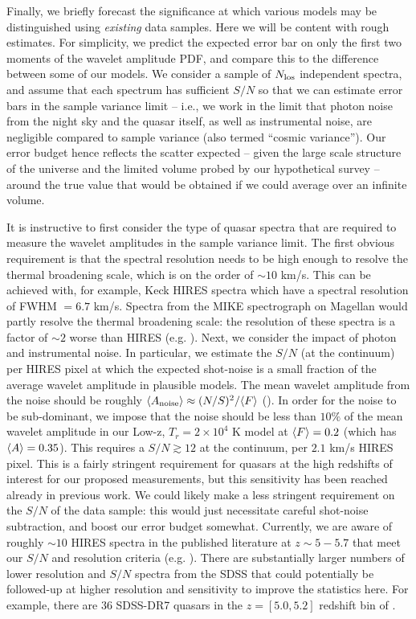 Finally, we briefly forecast the significance at which various models may be distinguished using {\it existing} data samples. Here
we will be content with rough estimates. For simplicity, we predict the expected error bar on
only the first two moments of the wavelet amplitude PDF, and compare this to the difference between some of our models. 
We consider a sample of $N_{\rm los}$ independent spectra, and assume that each spectrum has sufficient $S/N$ so that
we can estimate error bars in the sample variance limit -- i.e., we work in the limit that photon noise from the night
sky and the quasar itself, as well as instrumental noise, are negligible compared to sample variance (also termed ``cosmic variance''). Our error budget hence reflects the scatter expected -- given the large scale structure of the universe and the limited
volume probed by our hypothetical survey -- around the true value that would be obtained if we could average over an infinite
volume.

It is instructive to first consider the type of quasar spectra that are required to measure the wavelet amplitudes in
the sample variance limit. The first obvious requirement is that the spectral resolution needs to be high enough to resolve
the thermal broadening scale, which is on the order of $\sim 10$ km/s. This can be achieved with, for example, Keck HIRES spectra
which have a spectral resolution of FWHM $= 6.7$ km/s. Spectra from the MIKE spectrograph
on Magellan would partly resolve the thermal broadening scale: the resolution of these spectra is a factor of $\sim 2$ worse
than HIRES (e.g. \citealt{Becker:2010cu}). Next, we consider the impact of photon and instrumental noise. In particular,
we estimate the $S/N$ (at the continuum) per HIRES pixel at which the expected shot-noise is a small fraction of the average wavelet amplitude in plausible models. The mean wavelet amplitude from the noise should be roughly 
$\langle A_{\rm noise} \rangle \approx (N/S)^2/\langle F \rangle$ (\citealt{Hui:2000rw,Lidz:2009ca}). In order for the noise to be sub-dominant, we impose
that the noise should be less than $10\%$ of the
mean wavelet amplitude in our Low-z, $T_r = 2 \times 10^4$ K model at $\langle F \rangle=0.2$ (which has $\langle A \rangle=0.35$). This requires a
$S/N \gtrsim 12$ at the continuum, per $2.1$ km/s HIRES pixel. This is a fairly stringent requirement for quasars at the high
redshifts of interest for our proposed measurements, but this sensitivity has been reached already in previous work. We 
could likely make a less stringent
requirement on the $S/N$ of the data sample: this would just necessitate careful shot-noise subtraction, and boost our error budget
somewhat.   
Currently, we are aware of 
roughly $\sim 10$ HIRES spectra in the published literature at $z \sim 5-5.7$ that meet our $S/N$ and resolution criteria 
(e.g. \citealt{Becker:2011ee}). There are substantially larger numbers of lower resolution and $S/N$ spectra
from the SDSS that could potentially be followed-up at higher resolution and sensitivity to improve the statistics here. For example, there
are $36$ SDSS-DR7 quasars in the $z =[5.0,5.2]$ redshift bin of \citet{Becker:2012aq}.

